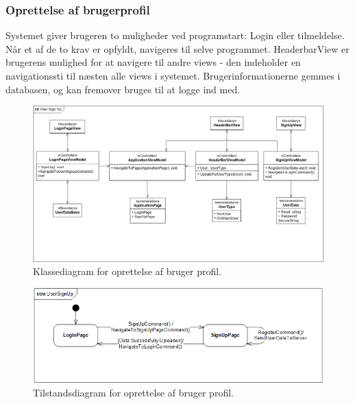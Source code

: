 \documentclass[Rapport/Rapport_main.tex]{subfiles}
\begin{document}
\subsubsection{Oprettelse af brugerprofil}
Systemet giver brugeren to muligheder ved programstart: Login eller tilmeldelse. Når et af de to krav er opfyldt, navigeres til selve programmet. HeaderbarView er brugerens mulighed for at navigere til andre views - den indeholder en navigationssti til næsten alle views i systemet. Brugerinformationerne gemmes i databasen, og kan fremover bruges til at logge ind med.  
\begin{figure}[H]
    \centering
    \includegraphics[width=\textwidth]{Arkitektur/Softwarearkitektur/User_Signup/graphics/UserSignUpCD.png}
    \caption{Klassediagram for oprettelse af bruger profil. }
    \label{fig:UserSignUpCD}
\end{figure}
\begin{figure}[H]
    \centering
    \includegraphics[width=\textwidth]{Arkitektur/Softwarearkitektur/User_Signup/graphics/UserSignUpSTM.png}
    \caption{Tilstandsdiagram for oprettelse af bruger profil. }
    \label{fig:UserSignUpSTM}
\end{figure}
\end{document}
